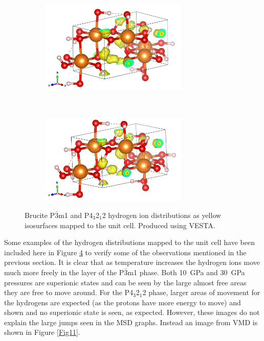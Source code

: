 \documentclass[a4paper,12pt]{article}
\begin{document}
\begin{figure}[h!!!!!!!!!!!!!!!!!!!!!]
\begin{subfigure}[t]{0.5\textwidth}
		\label{Fig10d}
	\end{subfigure}%
	\begin{subfigure}[t]{0.5\textwidth}
		\centering
		\includegraphics[width=7cm]{figures/p4_p200_t1800_Hdist.png}
		\label{Fig10e}
	\end{subfigure}%
	\\
	\begin{subfigure}[t]{0.5\textwidth}
		\centering
		\includegraphics[width=7cm]{figures/p4_p400_t1800_Hdist.png}
		\label{Fig10f}
	\end{subfigure}%
	\caption{Brucite P$\bar{3}$m1 and P4$_3$2$_1$2 hydrogen ion distributions as yellow isosurfaces mapped to the unit cell. Produced using VESTA.}
	\label{Fig10}
\end{figure}

Some examples of the hydrogen distributions mapped to the unit cell have been included here in Figure \ref{Fig10} to verify some of the observations mentioned in the previous section. It is clear that as temperature increases the hydrogen ions move much more freely in the layer of the P$\bar{3}$m1 phase.  Both \SI{10}{\GPa} and \SI{30}{\GPa} pressures are superionic states and can be seen by the large almost free areas they are free to move around. For the P4$_3$2$_1$2 phase, larger areas of movement for the hydrogens are expected (as the protons have more energy to move) and shown and no superionic state is seen, as expected. However, these images do not explain the large jumps seen in the MSD graphs. Instead an image from VMD is shown in Figure \ref{Fig11}.
\end{document}
